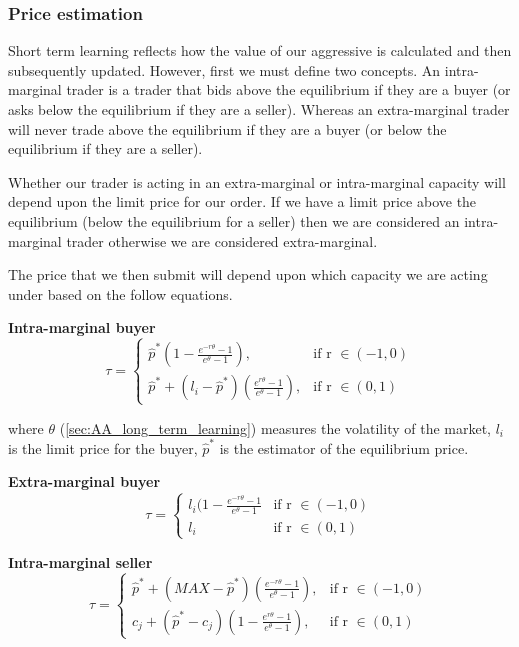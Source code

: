 \documentclass{acm_proc_article-sp}
\begin{document}
\subsubsection{Price estimation} \label{sec:AA_price_estimation}
Short term learning reflects how the value of our aggressive is calculated and
then subsequently updated. However, first we must define two concepts. An
intra-marginal trader is a trader that bids above the equilibrium if they are a
buyer (or asks below the equilibrium if they are a seller). Whereas an
extra-marginal trader will never trade above the equilibrium if they are a
buyer (or below the equilibrium if they are a seller).

Whether our trader is acting in an extra-marginal or intra-marginal capacity
will depend upon the limit price for our order. If we have a limit price above
the equilibrium (below the equilibrium for a seller) then we are considered an
intra-marginal trader otherwise we are considered extra-marginal.

The price that we then submit will depend upon which capacity we are acting
under based on the follow equations.

\textbf{Intra-marginal buyer}
\begin{equation}
\tau =
\begin{cases}
      \hat{p}^*(1- \frac{e^{-r\theta}-1}{e^{\theta}-1}), &  \text{if r } \in (-1,0)  \\
      \hat{p}^* + (l_i-\hat{p}^*)(\frac{e^{r\theta}-1}{e^\theta-1}), & \text{if
      r } \in (0,1)
\end{cases}
\label{intrabuyer}
\end{equation}

where $\theta$ (\ref{sec:AA_long_term_learning}) measures the volatility of the
market, $l_i$ is the limit price for the buyer, $\hat{p}^*$ is the estimator of the
equilibrium price.

\textbf{Extra-marginal buyer}
\begin{equation}
\tau =
\begin{cases}
      l_i(1-\frac{e^{-r\theta}-1}{e^\theta-1} &  \text{if r } \in (-1,0)  \\
      l_i & \text{if r } \in (0,1)
\end{cases}
\label{extrabuyer}
\end{equation}

\textbf{Intra-marginal seller}
\begin{equation}
\label{intraseller}
\tau =
\begin{cases}
      \hat{p}^* + (MAX-\hat{p}^*)( \frac{e^{-r\theta}-1}{e^{\theta}-1}), &  \text{if r } \in (-1,0)  \\
      c_j + (\hat{p}^*-c_j)(1-\frac{e^{r\theta}-1}{e^\theta-1}), & \text{if r } \in (0,1)
\end{cases}
\end{equation}
\end{document}
